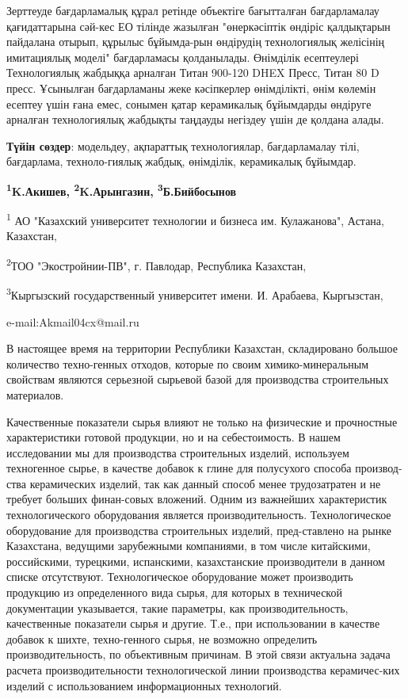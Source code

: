 Зерттеуде бағдарламалық құрал ретінде объектіге бағытталған
бағдарламалау қағидаттарына сәй-кес ЕО тілінде жазылған "өнеркәсіптік
өндіріс қалдықтарын пайдалана отырып, құрылыс бұйымда-рын өндірудің
технологиялық желісінің имитациялық моделі" бағдарламасы қолданылады.
Өнімділік есептеулері Технологиялық жабдыққа арналған Титан 900-120 DHEX
Пресс, Титан 80 D пресс. Ұсынылған бағдарламаны жеке кәсіпкерлер
өнімділікті, өнім көлемін есептеу үшін ғана емес, сонымен қатар
керамикалық бұйымдарды өндіруге арналған технологиялық жабдықты таңдауды
негіздеу үшін де қолдана алады.

{\bfseries Түйін сөздер}: модельдеу, ақпараттық технологиялар,
бағдарламалау тілі, бағдарлама, техноло-гиялық жабдық, өнімділік,
керамикалық бұйымдар.


\begin{center}
{\bfseries \textsuperscript{1}K.Акишев\envelope,
\textsuperscript{2}K.Арынгазин, \textsuperscript{3}Б.Бийбосынов}

\textsuperscript{1} АО "Казахский университет технологии и бизнеса им.
Кулажанова", Астана, Казахстан,

\textsuperscript{2}ТОО "Экостройнии-ПВ", г. Павлодар, Республика
Казахстан,

\textsuperscript{3}Кыргызский государственный университет имени. И.
Арабаева, Кыргызстан,

e-mail:Akmail04cx@mail.ru
\end{center}

В настоящее время на территории Республики Казахстан, складировано
большое количество техно-генных отходов, которые по своим
химико-минеральным свойствам являются серьезной сырьевой базой для
производства строительных материалов.

Качественные показатели сырья влияют не только на физические и
прочностные характеристики готовой продукции, но и на себестоимость. В
нашем исследовании мы для производства строительных изделий, используем
техногенное сырье, в качестве добавок к глине для полусухого способа
производ-ства керамических изделий, так как данный способ менее
трудозатратен и не требует больших финан-совых вложений. Одним из
важнейших характеристик технологического оборудования является
производительность. Технологическое оборудование для производства
строительных изделий, пред-ставлено на рынке Казахстана, ведущими
зарубежными компаниями, в том числе китайскими, российскими, турецкими,
испанскими, казахстанские производители в данном списке отсутствуют.
Технологическое оборудование может производить продукцию из
определенного вида сырья, для которых в технической документации
указывается, такие параметры, как производительность, качественные
показатели сырья и другие. Т.е., при использовании в качестве добавок к
шихте, техно-генного сырья, не возможно определить производительность, по
объективным причинам. В этой связи актуальна задача расчета
производительности технологической линии производства керамичес-ких
изделий с использованием информационных технологий.

